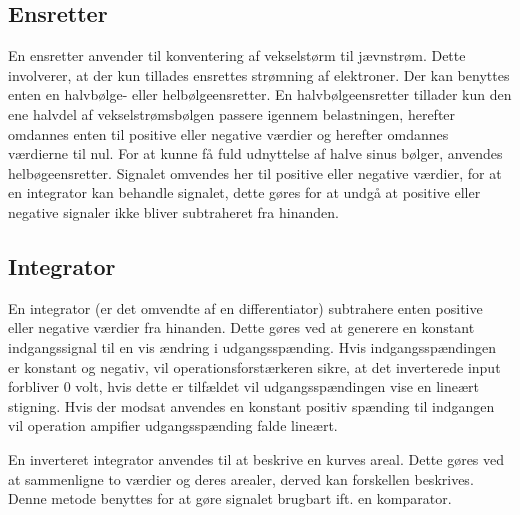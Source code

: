 \subsection{Ensretter}
En ensretter anvender til konventering af vekselstørm til jævnstrøm. Dette involverer, at der kun tillades ensrettes strømning af elektroner. Der kan benyttes enten en halvbølge- eller helbølgeensretter. En halvbølgeensretter tillader kun den ene halvdel af vekselstrømsbølgen passere igennem belastningen, herefter omdannes enten til positive eller negative værdier og herefter omdannes værdierne til nul.
For at kunne få fuld udnyttelse af halve sinus bølger, anvendes helbøgeensretter. Signalet omvendes her til positive eller negative værdier, for at en integrator kan behandle signalet, dette gøres for at undgå at positive eller negative signaler ikke bliver subtraheret fra hinanden. \cite{EEtech2003}

\subsection{Integrator}
En integrator (er det omvendte af en differentiator) subtrahere enten positive eller negative værdier fra hinanden. Dette gøres ved at generere en konstant indgangssignal til en vis ændring i udgangsspænding. Hvis indgangsspændingen er konstant og negativ, vil operationsforstærkeren sikre, at det inverterede input forbliver 0 volt, hvis dette er tilfældet vil udgangsspændingen vise en lineært stigning. Hvis der modsat anvendes en konstant positiv spænding til indgangen vil operation ampifier udgangsspænding falde lineært. \cite{EEtech2003}

En inverteret integrator anvendes til at beskrive en kurves areal. Dette gøres ved at sammenligne to værdier og deres arealer, derved kan forskellen beskrives. Denne metode benyttes for at gøre signalet brugbart ift. en komparator.


